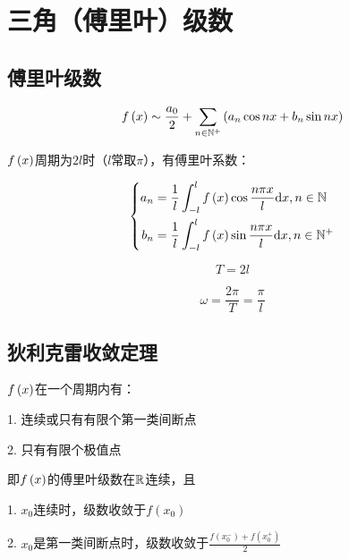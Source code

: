 \documentclass{article}
\begin{document}
\section{三角（傅里叶）级数}

\subsection{傅里叶级数}

\[f\left(x\right)\sim
    \frac{a_0}2+\sum_{n\in\mathbb N^+}\left(a_n\cos nx+b_n\sin nx\right)\]

$f\left(x\right)$周期为$2l$时（$l$常取$\pi$），有傅里叶系数：

\[\left\{\begin{aligned}
        a_n & =\frac1l\int_{-l}^lf\left(x\right)\cos\frac{n\pi x}l\mathrm d x,n\in\mathbb N  \\
        b_n & =\frac1l\int_{-l}^lf\left(x\right)\sin\frac{n\pi x}l\mathrm d x,n\in\mathbb N^+
    \end{aligned}\right.\]

\[T=2l\]

\[\omega=\frac{2\pi}T=\frac\pi l\]

\subsection{狄利克雷收敛定理}

$f\left(x\right)$在一个周期内有：

1. 连续或只有有限个第一类间断点

2. 只有有限个极值点

即$f\left(x\right)$的傅里叶级数在$\mathbb R$连续，且

1. $x_0$连续时，级数收敛于$f(x_0)$

2. $x_0$是第一类间断点时，级数收敛于$\frac{f(x_0^-)+f(x_0^+)}2$
\end{document}
